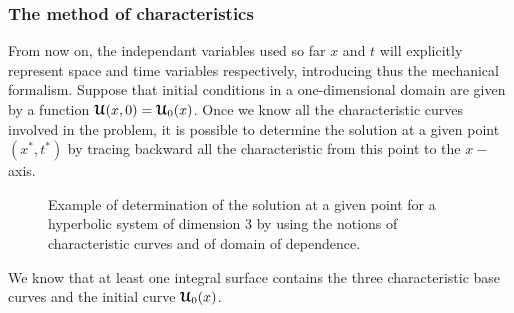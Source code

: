 \subsubsection*{The method of characteristics}
From now on, the independant variables used so far $x$ and $t$ will explicitly represent  space and time variables respectively, introducing thus the mechanical formalism. Suppose that initial conditions in a one-dimensional domain are given by a function ${\boldsymbol{\mathcal{U}}}(x,0)={\boldsymbol{\mathcal{U}}}_0(x)$. Once we know all the characteristic curves involved in the problem, it is possible to determine the solution at a given point $(x^*,t^*)$ by tracing backward all the characteristic from this point to the $x-$axis.
\begin{figure}[h]
  \centering
  
  \caption{Example of determination of the solution at a given point for a hyperbolic system of dimension 3 by using the notions of characteristic curves and of domain of dependence.}
  \label{fig:charac_method}
\end{figure}
We know that at least one integral surface contains the three characteristic base curves and the initial curve ${\boldsymbol{\mathcal{U}}}_0(x)$.
